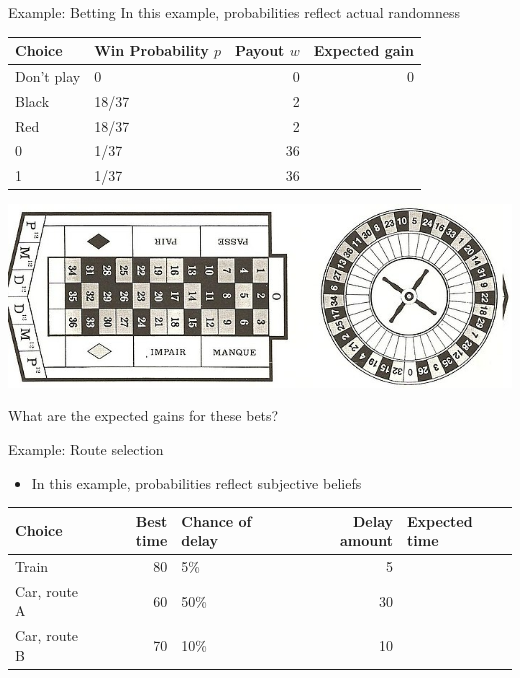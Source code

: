 \documentclass[smaller]{beamer}
\begin{document}
\begin{frame}[label={sec:orgc0d7c6a}]{Example: Betting}
In this example, probabilities reflect actual randomness

\begin{center}
\begin{tabular}{llrr}
\hline
Choice & Win Probability \(p\) & Payout \(w\) & Expected gain\\
\hline
Don't play & 0 & 0 & 0\\
Black & 18/37 & 2 & \\
Red & 18/37 & 2 & \\
0 & 1/37 & 36 & \\
1 & 1/37 & 36 & \\
\hline
\end{tabular}
\end{center}

\begin{center}
\includegraphics[width=.9\linewidth]{./figures/roulette.jpg}
\end{center}
What are the expected gains for these bets?
\end{frame}
\begin{frame}[label={sec:orgcf5cf82}]{Example: Route selection}
\begin{itemize}
\item In this example, probabilities reflect subjective beliefs
\end{itemize}

\begin{center}
\begin{tabular}{lrlrl}
\hline
Choice & Best time & Chance of delay & Delay amount & Expected time\\
\hline
Train & 80 & 5\% & 5 & \\
Car, route A & 60 & 50\% & 30 & \\
Car, route B & 70 & 10\% & 10 & \\
\hline
\end{tabular}
\end{center}
\end{frame}
\end{document}
